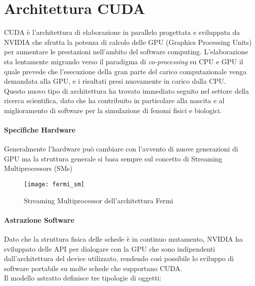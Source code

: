 \section{Architettura CUDA}

CUDA è l'architettura di elaborazione in parallelo progettata e sviluppata da
NVIDIA che sfrutta la potenza di calcolo delle GPU (Graphics Processing Units)
per aumentare le prestazioni nell'ambito del software computing.
L'elaborazione sta lentamente migrando verso il paradigma di
\textit{co-processing} su CPU e GPU il quale prevede che l'esecuzione della
gran parte del carico computazionale venga demandata alla GPU, e i risultati
presi nuovamente in carico dalla CPU.
\\
Questo nuovo tipo di architettura ha trovato immediato seguito nel settore
della ricerca scientifica, dato che ha contribuito in particolare alla nascita
e al miglioramento di software per la simulazione di fenomi fisici e
biologici.

\paragraph{Specifiche Hardware}

Generalmente l'hardware può cambiare con l'avvento di
nuove generazioni di GPU ma la struttura generale si basa sempre sul concetto di
Streaming Multiprocessors (SMs) \cite[p.~62]{nickolls2010gpu}

\begin{figure}[H]
    \centering
    \texttt{[image: fermi\_sm]}
    \caption{Streaming Multiprocessor dell'architettura Fermi 
        \cite[p.~63]{nickolls2010gpu}}
\end{figure}

\paragraph{Astrazione Software}

Dato che la struttura fisica delle schede è in continuo mutamento, NVIDIA ha
sviluppato delle API per dialogare con la GPU che sono indipendenti
dall'architettura del device utilizzato, rendendo così possibile lo sviluppo
di software portabile su molte schede che supportano CUDA.
\\
Il modello astratto definisce tre tipologie di oggetti:

